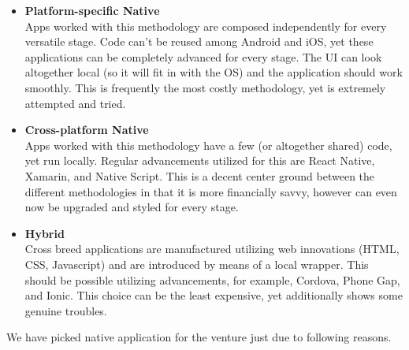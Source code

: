 \begin{itemize}
  \item \textbf{Platform-specific Native} \\
  Apps worked with this methodology are composed independently for every versatile stage. Code can't be reused among Android and iOS, yet these applications can be completely advanced for every stage. The UI can look altogether local (so it will fit in with the OS) and the application should work smoothly. This is frequently the most costly methodology, yet is extremely attempted and tried.
  
  \item \textbf{Cross-platform Native} \\ 
  Apps worked with this methodology have a few (or altogether shared) code, yet run locally. Regular advancements utilized for this are React Native, Xamarin, and Native Script. This is a decent center ground between the different methodologies in that it is more financially savvy, however can even now be upgraded and styled for every stage.
  
  \item \textbf{Hybrid} \\
 Cross breed applications are manufactured utilizing web innovations (HTML, CSS, Javascript) and are introduced by means of a local wrapper. This should be possible utilizing advancements, for example, Cordova, Phone Gap, and Ionic. This choice can be the least expensive, yet additionally shows some genuine troubles.
\end{itemize}

We have picked native application for the venture just due to following reasons.

